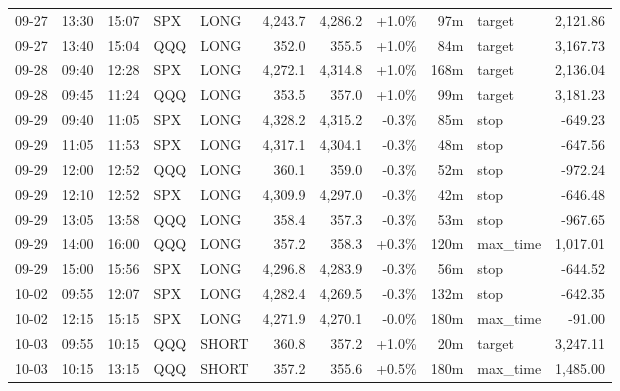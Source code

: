 \documentclass[11pt,a4paper,twoside]{article}
\begin{document}
\begin{center}
\begin{longtable}{>{\color{txtmain}}l l l l l r r r r >{\color{txtmain}}l r}
09-27 & 13:30 & 15:07 & SPX & LONG & 4,243.7 & 4,286.2 & \textcolor{wingreen}{+1.0\%} & 97m & target & \textcolor{wingreen}{2,121.86} \\
09-27 & 13:40 & 15:04 & QQQ & LONG & 352.0 & 355.5 & \textcolor{wingreen}{+1.0\%} & 84m & target & \textcolor{wingreen}{3,167.73} \\
09-28 & 09:40 & 12:28 & SPX & LONG & 4,272.1 & 4,314.8 & \textcolor{wingreen}{+1.0\%} & 168m & target & \textcolor{wingreen}{2,136.04} \\
09-28 & 09:45 & 11:24 & QQQ & LONG & 353.5 & 357.0 & \textcolor{wingreen}{+1.0\%} & 99m & target & \textcolor{wingreen}{3,181.23} \\
09-29 & 09:40 & 11:05 & SPX & LONG & 4,328.2 & 4,315.2 & \textcolor{lossred}{-0.3\%} & 85m & stop & \textcolor{lossred}{-649.23} \\
09-29 & 11:05 & 11:53 & SPX & LONG & 4,317.1 & 4,304.1 & \textcolor{lossred}{-0.3\%} & 48m & stop & \textcolor{lossred}{-647.56} \\
09-29 & 12:00 & 12:52 & QQQ & LONG & 360.1 & 359.0 & \textcolor{lossred}{-0.3\%} & 52m & stop & \textcolor{lossred}{-972.24} \\
09-29 & 12:10 & 12:52 & SPX & LONG & 4,309.9 & 4,297.0 & \textcolor{lossred}{-0.3\%} & 42m & stop & \textcolor{lossred}{-646.48} \\
09-29 & 13:05 & 13:58 & QQQ & LONG & 358.4 & 357.3 & \textcolor{lossred}{-0.3\%} & 53m & stop & \textcolor{lossred}{-967.65} \\
09-29 & 14:00 & 16:00 & QQQ & LONG & 357.2 & 358.3 & \textcolor{wingreen}{+0.3\%} & 120m & max\_time & \textcolor{wingreen}{1,017.01} \\
09-29 & 15:00 & 15:56 & SPX & LONG & 4,296.8 & 4,283.9 & \textcolor{lossred}{-0.3\%} & 56m & stop & \textcolor{lossred}{-644.52} \\
10-02 & 09:55 & 12:07 & SPX & LONG & 4,282.4 & 4,269.5 & \textcolor{lossred}{-0.3\%} & 132m & stop & \textcolor{lossred}{-642.35} \\
10-02 & 12:15 & 15:15 & SPX & LONG & 4,271.9 & 4,270.1 & \textcolor{lossred}{-0.0\%} & 180m & max\_time & \textcolor{lossred}{-91.00} \\
10-03 & 09:55 & 10:15 & QQQ & SHORT & 360.8 & 357.2 & \textcolor{wingreen}{+1.0\%} & 20m & target & \textcolor{wingreen}{3,247.11} \\
10-03 & 10:15 & 13:15 & QQQ & SHORT & 357.2 & 355.6 & \textcolor{wingreen}{+0.5\%} & 180m & max\_time & \textcolor{wingreen}{1,485.00} \\

\end{longtable}
\end{center}
\end{document}
